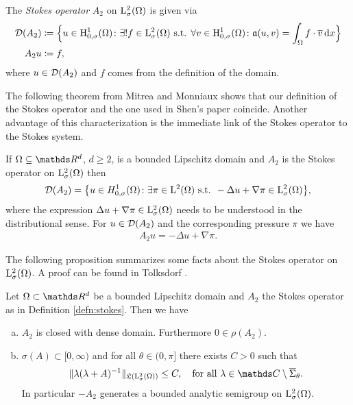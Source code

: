 \begin{defn}
  \label{defn:stokes}
  The \emph{Stokes operator} $A_2$ on $\mathrm{L}_\sigma^2(\Omega)$ is given via
  \begin{align*}
    \mathcal{D}(A_2) &\coloneqq \Big\{ u \in \mathrm{H}_{0,\sigma}^1(\Omega) \colon \exists ! f \in \mathrm{L}^2_\sigma(\Omega) \text{ s.t. } \forall v \in \mathrm{H}_{0,\sigma}^1(\Omega) \colon \mathfrak{a}(u,v) = \int_\Omega f \cdot \overline v \, {\operatorname{d}\!{x}} \Big\} \\
    A_2 u &\coloneqq f,
  \end{align*}
  where $u \in \mathcal{D}(A_2)$ and $f$ comes from the definition of the domain.
\end{defn}

The following theorem from Mitrea and Monniaux \cite[Thm 4.7]{mitreaMonniaux} shows that our definition of the Stokes operator and the one used in Shen's paper \cite{Shen2012} coincide. 
Another advantage of this characterization is the immediate link of the Stokes operator to the Stokes system.

\begin{thm}
  \label{thm:stokesOperatorL2}
  If $\Omega \subseteq \R^d$, $d \geq 2$, is a bounded Lipschitz domain and $A_2$ is the Stokes operator on $\mathrm{L}^2_\sigma(\Omega)$ then
  \begin{align*}
    \mathcal{D}(A_2) = \big\{ u \in H^1_{0,\sigma}(\Omega) \colon \exists \pi \in \mathrm{L}^2(\Omega) \text{ s.t. } -\Delta u + \nabla \pi \in \mathrm{L}^2_\sigma(\Omega) \big\},
  \end{align*}
  where the expression $\Delta u + \nabla \pi \in\mathrm{L}^2_\sigma(\Omega)$ needs to be understood in the distributional sense.
  For $u \in \mathcal{D}(A_2)$ and the corresponding pressure $\pi$ we have
  \begin{align*}
    A_2 u = -\Delta u + \nabla \pi.
  \end{align*}
\end{thm}

The following proposition summarizes some facts about the Stokes operator on $\mathrm{L}^2_\sigma(\Omega)$. A proof can be found in Tolksdorf \cite{tolksdorf}.

\begin{prop}
  \label{prop:stokesOperatorL2}
  Let $\Omega \subset \R^d$ be a bounded Lipschitz domain and $A_2$ the Stokes operator as in Definition \ref{defn:stokes}. Then we have
  \begin{enumerate}[a)]
    \item $A_2$ is closed with dense domain. Furthermore $0 \in \rho(A_2)$.
    \item $\sigma(A) \subset [0,\infty)$ and for all $\theta \in (0,\pi]$ there exists $C > 0$ such that
      \begin{align}
        \label{eq:resolventEstimateL2}
        \| \lambda(\lambda + A)^{-1} \|_{\Li(\Ell^2_\sigma(\Omega))} \leq C, \quad\text{for all } \lambda \in \C \setminus \overline \Sigma_\theta.
      \end{align}
      In particular $-A_2$ generates a bounded analytic semigroup on $\mathrm{L}^2_\sigma(\Omega)$.
  \end{enumerate}
\end{prop}

